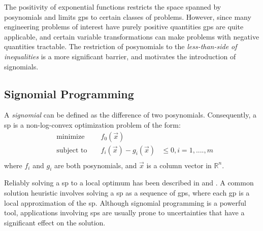 The positivity of exponential functions restricts the space spanned by posynomials and limits
\gls{gp}s to certain classes of problems.
However, since many engineering problems of interest have purely positive quantities \gls{gp}s
are quite applicable, and certain variable transformations can make problems with negative quantities tractable.
The restriction of posynomials to the \emph{less-than-side of
inequalities} is a more significant barrier, and motivates the introduction of signomials.

\subsection{Signomial Programming}
A {\em signomial} can be defined as the difference of two posynomials. Consequently,
a \gls{sp} is a non-log-convex optimization problem of the form:
\begin{equation}
\begin{aligned}
&\text{minimize } && f_{0}(\vec{x}) \\
&\text{subject to } && f_{i}(\vec{x}) - g_{i}(\vec{x})& \leq 0, i = 1, ...., m \\
\end{aligned}
\end{equation}
where $f_{i}$ and $g_{i}$ are both posynomials, and $\vec{x}$ is a column vector in $\mathbb{R}^n$. 

Reliably solving a \gls{sp} to a local optimum has been described in \cite{Boyd2007} and \cite{Lipp2016}.
A common solution heuristic involves solving a \gls{sp} as a sequence of \gls{gp}s,
where each \gls{gp} is a local approximation of the \gls{sp}.
Although signomial programming is a powerful tool, applications involving \gls{sp}s are usually prone
to uncertainties that have a significant effect on the solution.
